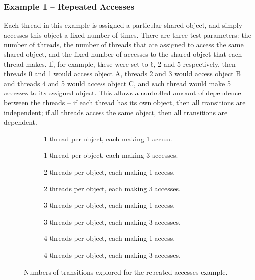 \documentclass[12pt,a4paper,twoside,openright]{report}
\newenvironment{figtile} %
{\begin{subfigure}{0.48\textwidth}
		\def\svgwidth{\textwidth}
		\captionsetup{font=footnotesize}
	}
	{\end{subfigure}}
\begin{document}
\subsubsection{Example 1 -- Repeated Accesses}
Each thread in this example is assigned a particular
shared object, and simply accesses this object a
fixed number of times. There are three test parameters:
the number of threads, the number of threads that are
assigned to access the same shared object, and the fixed
number of accesses to the shared object that each thread
makes. If, for example, these were set to 6, 2 and 5
respectively, then threads 0 and 1 would access object A,
threads 2 and 3 would access object B and threads 4 and 5
would access object C, and each thread would make 5 accesses
to its assigned object. This allows a controlled amount of
dependence between the threads -- if each thread has its own
object, then all transitions are independent; if all threads
access the same object, then all transitions are dependent.

\begin{figure}
	\centering
	\footnotesize
	\begin{figtile}
		
		\caption{1 thread per object,
			each making 1 access.}
	\end{figtile}%
	\quad
	\begin{figtile}
		
		\caption{1 thread per object,
			each making 3 accesses.}
	\end{figtile}
	\begin{figtile}
		
		\caption{2 threads per object,
			each making 1 access.}
	\end{figtile}%
	\quad
	\begin{figtile}
		
		\caption{2 threads per object,
			each making 3 accesses.}
	\end{figtile}
	\begin{figtile}
		
		\caption{3 threads per object,
			each making 1 access.}
	\end{figtile}%
	\quad
	\begin{figtile}
		
		\caption{3 threads per object,
			each making 3 accesses.}
	\end{figtile}
	\begin{figtile}
		
		\caption{4 threads per object,
			each making 1 access.}
	\end{figtile}%
	\quad
	\begin{figtile}
		
		\caption{4 threads per object,
			each making 3 accesses.}
		\label{fig:repeated-access-trans-h}
	\end{figtile}
	\caption{Numbers of transitions
		explored for the repeated-accesses example.}
	\label{fig:repeated-access-trans}
\end{figure}
\end{document}
